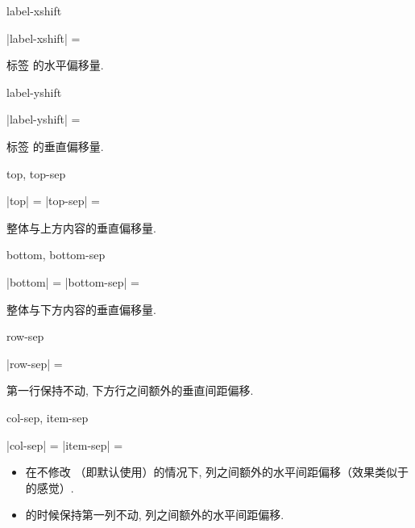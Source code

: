 \documentclass{l3doc}
\begin{document}
\begin{documentation}
\begin{function}{label-xshift}
  \begin{syntax}
    |label-xshift| = 
  \end{syntax}
  标签  的水平偏移量.
\end{function}

\begin{function}{label-yshift}
  \begin{syntax}
    |label-yshift| = 
  \end{syntax}
  标签  的垂直偏移量.
\end{function}

\begin{function}[updated = 2022-01-09]{top, top-sep}
  \begin{syntax}
    |top| = 
    |top-sep| = 
  \end{syntax}
  整体与上方内容的垂直偏移量.
\end{function}


\begin{function}[updated = 2022-01-09]{bottom, bottom-sep}
  \begin{syntax}
    |bottom| = 
    |bottom-sep| = 
  \end{syntax}
  整体与下方内容的垂直偏移量.
\end{function}


\begin{function}[updated = 2022-01-09]{row-sep}
  \begin{syntax}
    |row-sep| = 
  \end{syntax}
  第一行保持不动, 下方行之间额外的垂直间距偏移.
\end{function}

\begin{function}[updated = 2022-01-09]{col-sep, item-sep}
  \begin{syntax}
    |col-sep| = 
    |item-sep| = 
  \end{syntax}
    \begin{itemize}
      \item 在不修改  （即默认使用）的情况下, 列之间额外的水平间距偏移（效果类似于  的感觉）. 
      \item {} 的时候保持第一列不动, 列之间额外的水平间距偏移. 
    \end{itemize}
\end{function}


\end{documentation}
\end{document}
